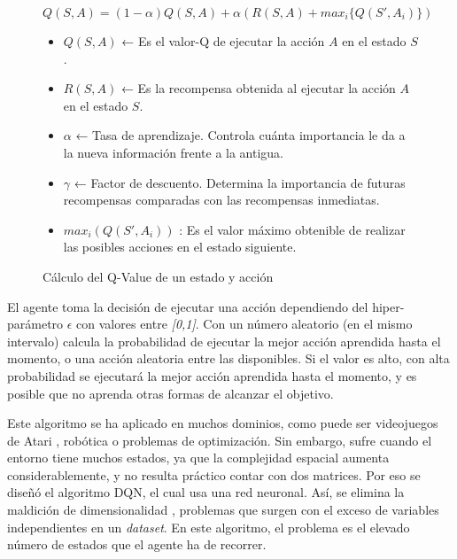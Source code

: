 		
		\begin{figure}[!h]				
		\begin{flushleft}
		\begin{mdframed}[roundcorner=5pt]
			\[
			Q(S,A) = (1 - \alpha) Q(S,A) + \alpha \left( R(S,A) + max_{i} \{ Q(S',A_i) \} \right)
			\]
			\begin{itemize}
				\item \( Q(S,A) \) ← Es el valor-Q de ejecutar la acción \( A \) en el estado \( S \).
				\item \( R(S,A) \) ← Es la recompensa obtenida al ejecutar la acción \( A \) en el estado \( S \).
				\item \( \alpha \) ← Tasa de aprendizaje. Controla cuánta importancia le da a la nueva información frente a la antigua.
				\item \( \gamma \) ← Factor de descuento. Determina la importancia de futuras recompensas comparadas con las recompensas inmediatas.
				\item \( max_{i}(Q(S',A_i)) \) : Es el valor máximo obtenible de realizar las posibles acciones en el estado siguiente.
			\end{itemize}
		\end{mdframed}		
		\end{flushleft}
		\caption{Cálculo del Q-Value de un estado y acción}	
		\label{fig:qvalue}
		\end{figure}
		
		
		El agente toma la decisión de ejecutar una acción dependiendo del hiper-parámetro $\epsilon$  con valores entre \textit{[0,1]}. Con un número aleatorio (en el mismo intervalo) calcula la probabilidad de ejecutar la mejor acción aprendida hasta el momento, o una acción aleatoria entre las disponibles. Si el valor es alto, con alta probabilidad se ejecutará la mejor acción aprendida hasta el momento, y es posible que no aprenda otras formas de alcanzar el objetivo.
		
		
		Este algoritmo se ha aplicado en muchos dominios, como puede ser videojuegos de Atari \cite{mnih2013playing}, robótica o problemas de optimización. Sin embargo, sufre cuando el entorno tiene muchos estados, ya que la complejidad espacial aumenta considerablemente, y no resulta práctico contar con dos matrices. Por eso se diseñó el algoritmo DQN, el cual usa una red neuronal. Así, se elimina la maldición de dimensionalidad \cite{kuo2005lifting}, problemas que surgen con el exceso de variables independientes en un \textit{dataset}. En este algoritmo, el problema es el elevado número de estados que el agente ha de recorrer.
		
